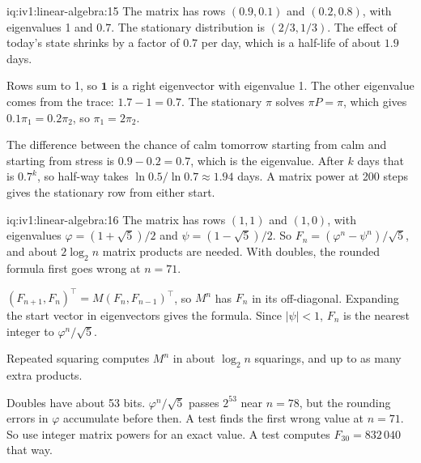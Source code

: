 \begin{solution}{iq:iv1:linear-algebra:15}
The matrix has rows $(0.9, 0.1)$ and $(0.2, 0.8)$, with eigenvalues 1 and $0.7$. The stationary distribution is $(2/3, 1/3)$. The effect of today's state shrinks by a factor of $0.7$ per day, which is a half-life of about $1.9$ days.

Rows sum to 1, so $\mathbf{1}$ is a right eigenvector with eigenvalue 1. The other eigenvalue comes from the trace: $1.7 - 1 = 0.7$. The stationary $\pi$ solves $\pi P = \pi$, which gives $0.1\pi_1 = 0.2\pi_2$, so $\pi_1 = 2\pi_2$.

The difference between the chance of calm tomorrow starting from calm and starting from stress is $0.9 - 0.2 = 0.7$, which is the eigenvalue. After $k$ days that is $0.7^k$, so half-way takes $\ln 0.5/\ln 0.7 \approx 1.94$ days. A matrix power at 200 steps gives the stationary row from either start.

\end{solution}

\begin{solution}{iq:iv1:linear-algebra:16}
The matrix has rows $(1, 1)$ and $(1, 0)$, with eigenvalues $\varphi = (1 + \sqrt{5})/2$ and $\psi = (1 - \sqrt{5})/2$. So $F_n = (\varphi^n - \psi^n)/\sqrt{5}$, and about $2\log_2 n$ matrix products are needed. With doubles, the rounded formula first goes wrong at $n = 71$.

$(F_{n + 1}, F_n)^\top = M(F_n, F_{n - 1})^\top$, so $M^n$ has $F_n$ in its off-diagonal. Expanding the start vector in eigenvectors gives the formula. Since $|\psi| < 1$, $F_n$ is the nearest integer to $\varphi^n/\sqrt{5}$.

Repeated squaring computes $M^n$ in about $\log_2 n$ squarings, and up to as many extra products.

Doubles have about 53 bits. $\varphi^n/\sqrt{5}$ passes $2^{53}$ near $n = 78$, but the rounding errors in $\varphi$ accumulate before then. A test finds the first wrong value at $n = 71$. So use integer matrix powers for an exact value. A test computes $F_{30} = 832\,040$ that way.

\end{solution}

